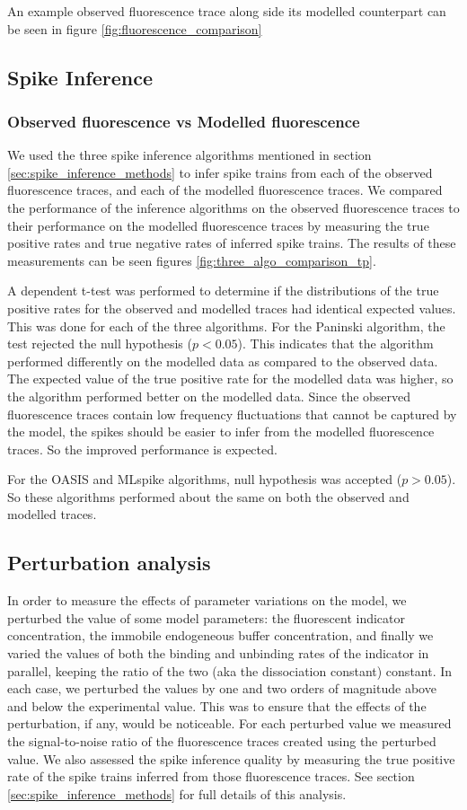 \documentclass[a4paper,12pt]{article}
\theoremstyle{definition}
\begin{document}
An example observed fluorescence trace along side its modelled counterpart can be seen in figure \ref{fig:fluorescence_comparison}

\subsection{Spike Inference}

\subsubsection{Observed fluorescence vs Modelled fluorescence}
We used the three spike inference algorithms mentioned in section \ref{sec:spike_inference_methods} to infer spike trains from each of the observed fluorescence traces, and each of the modelled fluorescence traces. We compared the performance of the inference algorithms on the observed fluorescence traces to their performance on the modelled fluorescence traces by measuring the true positive rates and true negative rates of inferred spike trains. The results of these measurements can be seen figures \ref{fig:three_algo_comparison_tp}.

A dependent t-test was performed to determine if the distributions of the true positive rates for the observed and modelled traces had identical expected values. This was done for each of the three algorithms. For the Paninski algorithm, the test rejected the null hypothesis ($p < 0.05$). This indicates that the algorithm performed differently on the modelled data as compared to the observed data. The expected value of the true positive rate for the modelled data was higher, so the algorithm performed better on the modelled data. Since the observed fluorescence traces contain low frequency fluctuations that cannot be captured by the model, the spikes should be easier to infer from the modelled fluorescence traces. So the improved performance is expected.

For the OASIS and MLspike algorithms, null hypothesis was accepted ($p > 0.05$). So these algorithms performed about the same on both the observed and modelled traces.

\subsection{Perturbation analysis}
In order to measure the effects of parameter variations on the model, we perturbed the value of some model parameters: the fluorescent indicator concentration, the immobile endogeneous buffer concentration, and finally we varied the values of both the binding and unbinding rates of the indicator in parallel, keeping the ratio of the two (aka the dissociation constant) constant. In each case, we perturbed the values by one and two orders of magnitude above and below the experimental value. This was to ensure that the effects of the perturbation, if any, would be noticeable. For each perturbed value we measured the signal-to-noise ratio of the fluorescence traces created using the perturbed value. We also assessed the spike inference quality by measuring the true positive rate of the spike trains inferred from those fluorescence traces. See section \ref{sec:spike_inference_methods} for full details of this analysis.
\end{document}

